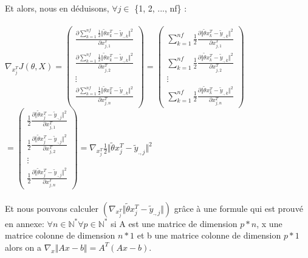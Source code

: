 \documentclass[a4paper,10pt]{article}
\begin{document}
\noindent Et alors, nous en d\'{e}duisons, $\forall j \in$ \{1, 2, ..., nf\} :\\\\
$\nabla_{x_{j}^T} J(\theta, X)=
\begin{pmatrix}
\displaystyle\frac{\partial \displaystyle\sum_{k=1}^{nf}\frac{1}{2}\Vert\tilde{\theta}x_{k}^{T}-\tilde{y}_{.,k}\Vert^{2}}{\partial x_{j,1}^{T}}\\
\displaystyle\frac{\partial \displaystyle\sum_{k=1}^{nf}\frac{1}{2}\Vert\tilde{\theta}x_{k}^{T}-\tilde{y}_{.,k}\Vert^{2}}{\partial x_{j,2}^{T}}\\
\vdots\\
\displaystyle\frac{\partial \displaystyle\sum_{k=1}^{nf}\frac{1}{2}\Vert\tilde{\theta}x_{k}^{T}-\tilde{y}_{.,k}\Vert^{2}}{\partial x_{j,n}^{T}}
\end{pmatrix}
=
\begin{pmatrix}
\displaystyle\sum_{k=1}^{nf}
\frac{1}{2}\frac{\partial\Vert\tilde{\theta}x_{k}^{T}-\tilde{y}_{.,k}\Vert^{2}}{\partial x_{j,1}^{T}}\\
\displaystyle\sum_{k=1}^{nf}
\frac{1}{2}\frac{\partial\Vert\tilde{\theta}x_{k}^{T}-\tilde{y}_{.,k}\Vert^{2}}{\partial x_{j,2}^{T}}\\
\vdots\\
\displaystyle\sum_{k=1}^{nf}
\frac{1}{2}\frac{\partial\Vert\tilde{\theta}x_{k}^{T}-\tilde{y}_{.,k}\Vert^{2}}{\partial x_{j,n}^{T}}
\end{pmatrix}$\\
$
=
\begin{pmatrix}
\displaystyle
\frac{1}{2}\frac{\partial\Vert\tilde{\theta}x_{j}^{T}-\tilde{y}_{.,j}\Vert^{2}}{\partial x_{j,1}^{T}}\\
\displaystyle
\frac{1}{2}\frac{\partial\Vert\tilde{\theta}x_{j}^{T}-\tilde{y}_{.,j}\Vert^{2}}{\partial x_{j,2}^{T}}\\
\vdots\\
\displaystyle
\frac{1}{2}\frac{\partial\Vert\tilde{\theta}x_{j}^{T}-\tilde{y}_{.,j}\Vert^{2}}{\partial x_{j,n}^{T}}
\end{pmatrix}
=
\displaystyle
\nabla_{x_{j}^T}\frac{1}{2}\Vert\tilde{\theta}x_{j}^{T}-\tilde{y}_{.,j}\Vert^{2}
$\\\\
Et nous pouvons calculer $(\nabla_{x_{j}^{T}}\Vert\tilde{\theta}x_{j}^{T}-\tilde{y}_{.,j}\Vert)$ gr\^{a}ce \`{a} une formule qui est prouvé en annexe: $\forall n \in \mathbb{N}^{*} \forall p \in \mathbb{N}^{*}$ si A est une matrice de dimension $p*n$, x une matrice colonne de dimension $n*1$ et b une matrice colonne de dimension $p*1$ alors on a $\nabla_{x}\Vert Ax-b \Vert = A^{T}(Ax-b)$.\\\\
\end{document}
